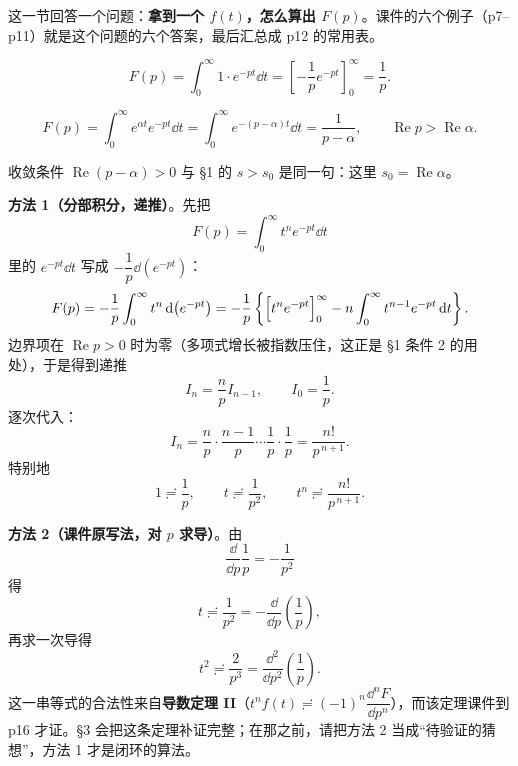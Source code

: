 \documentclass[11pt]{ctexart}
\begin{document}

这一节回答一个问题：\textbf{拿到一个 $f(t)$，怎么算出 $F(p)$}。课件的六个例子（p7--p11）就是这个问题的六个答案，最后汇总成 p12 的常用表。


\[ F(p)=\int_{0}^{\infty}1\cdot e^{-pt}\dd t=\left[-\frac{1}{p}e^{-pt}\right]_{0}^{\infty}=\frac{1}{p} .\]



\[ F(p)=\int_{0}^{\infty}e^{\alpha t}e^{-pt}\dd t=\int_{0}^{\infty}e^{-(p-\alpha)t}\dd t=\frac{1}{p-\alpha},\qquad
\operatorname{Re}p>\operatorname{Re}\alpha .\]

收敛条件 $\operatorname{Re}(p-\alpha)>0$ 与 §1 的 $s>s_0$ 是同一句：这里 $s_0=\operatorname{Re}\alpha$。


\textbf{方法 1（分部积分，递推）}。先把
\[ F(p)=\int_{0}^{\infty}t^n e^{-pt}\dd t \]
里的 $e^{-pt}\dd t$ 写成 $-\dfrac{1}{p}\dd\!\left(e^{-pt}\right)$：
\[ F(p)=-\frac{1}{p}\int_{0}^{\infty}t^n\,\mathrm{d}\!\left(e^{-pt}\right)
=-\frac{1}{p}\left\{\Bigl[t^ne^{-pt}\Bigr]_{0}^{\infty}-n\int_{0}^{\infty}t^{n-1}e^{-pt}\,\mathrm{d} t\right\} .\]
边界项在 $\operatorname{Re}p>0$ 时为零（多项式增长被指数压住，这正是 §1 条件 2 的用处），于是得到递推
\[ I_n=\frac{n}{p}I_{n-1},\qquad I_0=\frac{1}{p} .\]
逐次代入：
\[ I_n=\frac{n}{p}\cdot\frac{n-1}{p}\cdots\frac{1}{p}\cdot\frac{1}{p}=\frac{n!}{p^{\,n+1}} .\]
特别地
\[ 1\risingdotseq\frac{1}{p},\qquad t\risingdotseq\frac{1}{p^{2}},\qquad t^{n}\risingdotseq\frac{n!}{p^{\,n+1}} .\]

\textbf{方法 2（课件原写法，对 $p$ 求导）}。由
\[ \frac{\dd}{\dd p}\frac{1}{p}=-\frac{1}{p^{2}} \]
得
\[ t\risingdotseq\frac{1}{p^{2}}=-\frac{\dd}{\dd p}\left(\frac{1}{p}\right),\]
再求一次导得
\[ t^{2}\risingdotseq\frac{2}{p^{3}}=\frac{\dd^{2}}{\dd p^{2}}\left(\frac{1}{p}\right) .\]
这一串等式的合法性来自\textbf{导数定理 II}（$t^nf(t)\risingdotseq(-1)^n\dfrac{\dd^nF}{\dd p^n}$），而该定理课件到 p16 才证。§3 会把这条定理补证完整；在那之前，请把方法 2 当成“待验证的猜想”，方法 1 才是闭环的算法。

\end{document}
